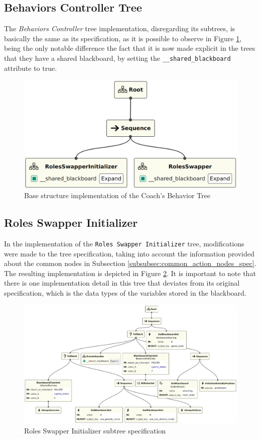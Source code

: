 \subsection{Behaviors Controller Tree}

The \textit{Behaviors Controller} tree implementation, disregarding its subtrees, is basically the same as its specification, as it is possible to observe in Figure \ref{fig:behaviors_controller_bt_impl}, being the only notable difference the fact that it is now made explicit in the trees that they have a shared blackboard, by setting the \texttt{\_\_shared\_blackboard} attribute to true.

\begin{figure}[!h]
    \centering
    \includegraphics[width=0.5\linewidth]{chapters/development/images/BehaviorsController.png}
    \caption{Base structure implementation of the Coach’s Behavior Tree}
    \label{fig:behaviors_controller_bt_impl}
\end{figure}

\subsection{Roles Swapper Initializer}

In the implementation of the \texttt{Roles Swapper Initializer} tree, modifications were made to the tree specification, taking into account the information provided about the common nodes in Subsection \ref{subsubsec:common_action_nodes_spec}. The resulting implementation is depicted in Figure \ref{fig:roles_swapper_initializer_impl}. It is important to note that there is one implementation detail in this tree that deviates from its original specification, which is the data types of the variables stored in the blackboard.

\begin{figure}[!h]
    \centering
    \includegraphics[width=1.0\linewidth]{chapters/development/images/RolesSwapperInitializer.png}
    \caption{Roles Swapper Initializer subtree specification}
    \label{fig:roles_swapper_initializer_impl}
\end{figure}

